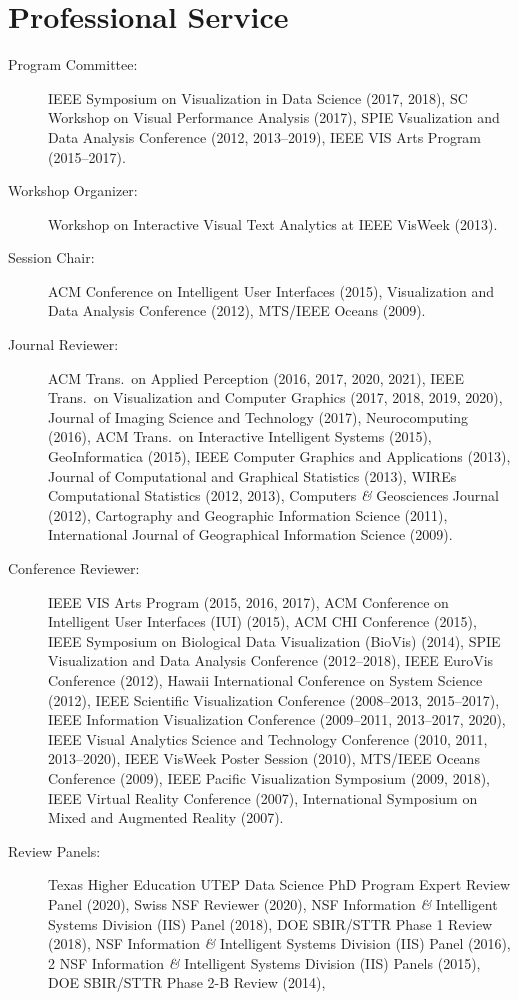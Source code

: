\documentclass[11pt, letterpaper]{article}
\newcommand{\amper}{{\fontspec[Scale=.95]{Hoefler Text}\selectfont\itshape\&}}
\begin{document}
\section*{Professional Service}
\begin{sloppypar}
\begin{description}
  \item[Program Committee:] IEEE Symposium on Visualization in Data Science (2017, 2018), SC Workshop on Visual Performance Analysis (2017), SPIE Vsualization and Data Analysis Conference (2012, 2013--2019), IEEE VIS Arts Program (2015--2017).
  \item[Workshop Organizer:] Workshop on Interactive Visual Text Analytics at IEEE VisWeek (2013).
  \item[Session Chair:]ACM Conference on Intelligent User Interfaces (2015), Visualization and
  Data Analysis Conference (2012), MTS/IEEE Oceans (2009).
  \item[Journal Reviewer:] ACM Trans.\ on Applied Perception (2016, 2017, 2020, 2021), IEEE Trans.\ on Visualization and Computer Graphics (2017, 2018, 2019, 2020), Journal of Imaging Science and Technology (2017), Neurocomputing (2016), ACM Trans.\ on Interactive Intelligent Systems (2015), GeoInformatica (2015), IEEE Computer Graphics and Applications (2013),
  Journal of Computational and Graphical Statistics (2013),
  WIREs Computational Statistics (2012, 2013),
  Computers \amper{} Geosciences Journal (2012),
  Cartography and Geographic Information Science (2011),
  International Journal of Geographical Information Science (2009).
  \item[Conference Reviewer:] IEEE VIS Arts Program (2015, 2016, 2017),
  ACM Conference on Intelligent User Interfaces
  (IUI) (2015), ACM CHI Conference (2015),
  IEEE Symposium on Biological Data Visualization (BioVis) (2014),
  SPIE Visualization and Data Analysis Conference (2012--2018),
  IEEE EuroVis Conference (2012),
  Hawaii International Conference on System
  Science (2012), IEEE Scientific Visualization Conference (2008--2013, 2015--2017), IEEE Information Visualization Conference (2009--2011, 2013--2017, 2020),
  IEEE Visual Analytics Science and Technology Conference (2010, 2011, 2013--2020), IEEE VisWeek Poster Session (2010),
  MTS/IEEE Oceans Conference (2009), IEEE Pacific Visualization Symposium
  (2009, 2018), IEEE Virtual Reality Conference (2007), International Symposium
  on Mixed and Augmented Reality (2007).
  \item[Review Panels:] Texas Higher Education UTEP Data Science PhD Program Expert Review Panel (2020), Swiss NSF Reviewer (2020), NSF Information \amper{} Intelligent Systems Division (IIS) Panel (2018), DOE SBIR/STTR Phase 1 Review (2018), NSF Information \amper{} Intelligent Systems Division (IIS) Panel (2016), 2 NSF Information \amper{} Intelligent Systems Division (IIS) Panels (2015), DOE SBIR/STTR Phase 2-B Review (2014),

\end{description}
\end{sloppypar}
\end{document}
